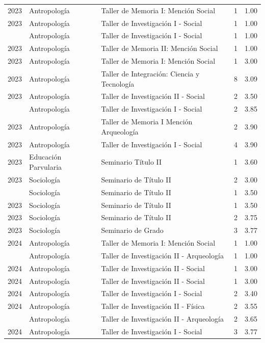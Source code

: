 \documentclass[
  spanish,
  a4paper,
  oneside]{scrbook}
\begin{document}
\begin{longtable}[t]{lllrr}
2023 & Antropología & Taller de Memoria I: Mención Social & 1 & 1.00\\
2023 & Antropología & Taller de Investigación I - Social & 1 & \vphantom{1} 1.00\\
\addlinespace
2023 & Antropología & Taller de Investigación I - Social & 1 & 1.00\\
2023 & Antropología & Taller de Memoria II: Mención Social & 1 & 1.00\\
2023 & Antropología & Taller de Memoria I: Mención Social & 1 & 3.00\\
2023 & Antropología & Taller de Integración: Ciencia y Tecnología & 8 & 3.09\\
2023 & Antropología & Taller de Investigación II - Social & 2 & 3.50\\
\addlinespace
2023 & Antropología & Taller de Investigación I - Social & 2 & 3.85\\
2023 & Antropología & Taller de Memoria I Mención Arqueología & 2 & 3.90\\
2023 & Antropología & Taller de Investigación I - Social & 4 & 3.90\\
2023 & Educación Parvularia & Seminario Título II & 1 & 3.60\\
2023 & Sociología & Seminario de Título II & 2 & 3.00\\
\addlinespace
2023 & Sociología & Seminario de Título II & 1 & \vphantom{1} 3.50\\
2023 & Sociología & Seminario de Título II & 1 & 3.50\\
2023 & Sociología & Seminario de Título II & 2 & 3.75\\
2023 & Sociología & Seminario de Grado & 3 & 3.77\\
2024 & Antropología & Taller de Memoria I: Mención Social & 1 & 1.00\\
\addlinespace
2024 & Antropología & Taller de Investigación II - Arqueología & 1 & 1.00\\
2024 & Antropología & Taller de Investigación II - Social & 1 & \vphantom{1} 3.00\\
2024 & Antropología & Taller de Investigación II - Social & 1 & 3.00\\
2024 & Antropología & Taller de Investigación I - Social & 2 & 3.40\\
2024 & Antropología & Taller de Investigación II - Física & 2 & 3.55\\
\addlinespace
2024 & Antropología & Taller de Investigación II - Arqueología & 2 & 3.65\\
2024 & Antropología & Taller de Investigación I - Social & 3 & 3.77\\

\end{longtable}
\end{document}
